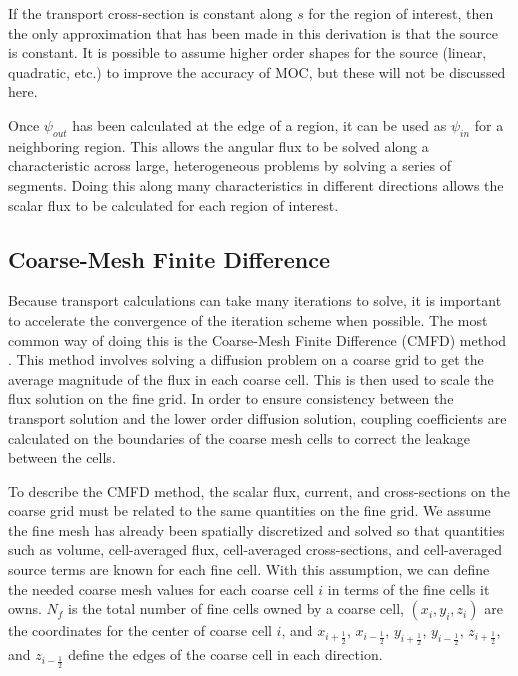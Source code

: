 If the transport cross-section is constant along $s$ for the region of interest, then the only approximation that has been made in this derivation is that the source is constant.  It is possible to assume higher order shapes for the source (linear, quadratic, etc.) to improve the accuracy of MOC, but these will not be discussed here.

Once $\psi_{out}$ has been calculated at the edge of a region, it can be used as $\psi_{in}$ for a neighboring region.  This allows the angular flux to be solved along a characteristic across large, heterogeneous problems by solving a series of segments.  Doing this along many characteristics in different directions allows the scalar flux to be calculated for each region of interest.


\subsection{Coarse-Mesh Finite Difference}\label{ss:CMFD}

Because transport calculations can take many iterations to solve, it is important to accelerate the convergence of the iteration scheme when possible.  The most common way of doing this is the Coarse-Mesh Finite Difference (CMFD) method \cite{SmithCMFDOrig}.  This method involves solving a diffusion problem on a coarse grid to get the average magnitude of the flux in each coarse cell.  This is then used to scale the flux solution on the fine grid.  In order to ensure consistency between the transport solution and the lower order diffusion solution, coupling coefficients are calculated on the boundaries of the coarse mesh cells to correct the leakage between the cells.

To describe the CMFD method, the scalar flux, current, and cross-sections on the coarse grid must be related to the same quantities on the fine grid.  We assume the fine mesh has already been spatially discretized and solved so that quantities such as volume, cell-averaged flux, cell-averaged cross-sections, and cell-averaged source terms are known for each fine cell.  With this assumption, we can define the needed coarse mesh values for each coarse cell $i$ in terms of the fine cells it owns.  $N_f$ is the total number of fine cells owned by a coarse cell, $\left(x_i,y_i,z_i\right)$ are the coordinates for the center of coarse cell $i$, and $x_{i+\frac{1}{2}}$, $x_{i-\frac{1}{2}}$, $y_{i+\frac{1}{2}}$, $y_{i-\frac{1}{2}}$, $z_{i+\frac{1}{2}}$, and $z_{i-\frac{1}{2}}$ define the edges of the coarse cell in each direction.

